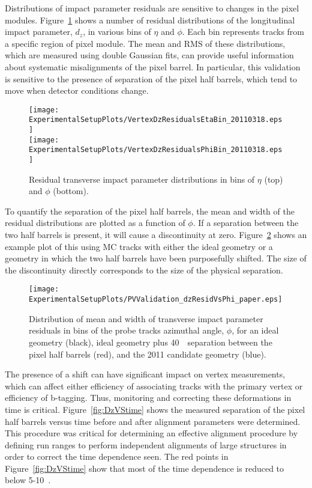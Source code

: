 Distributions of impact parameter residuals are sensitive to changes in the
pixel modules.
Figure~\ref{fig:PVresiduals}
shows a number of residual distributions of the longitudinal
impact parameter, $d_z$, in various bins of $\eta$ and
$\phi$.  Each bin represents tracks from a specific region of pixel 
module.  The mean and RMS of these distributions, which are measured
using double Gaussian fits, can provide useful
information about systematic misalignments of the pixel barrel.  In
particular, this validation is sensitive to the presence of separation of the
pixel half barrels, which tend to move when detector conditions 
change.

\begin{figure}
\begin{center}
\texttt{[image: ExperimentalSetupPlots/VertexDzResidualsEtaBin\_20110318.eps]}\\
\texttt{[image: ExperimentalSetupPlots/VertexDzResidualsPhiBin\_20110318.eps]}
\caption{Residual transverse impact parameter distributions in 
bins of $\eta$ (top) and $\phi$ (bottom).}
\label{fig:PVresiduals}
\end{center}
\end{figure}

To quantify the separation of the pixel half barrels, the mean and
width of the residual distributions are plotted as a function of
$\phi$.  If a separation between the two half barrels is present, it
will cause a discontinuity at zero.  Figure~\ref{fig:dzResidVsPhi}
shows an example plot of this using MC tracks with either the ideal
geometry or a geometry in which the two half barrels have been 
purposefully shifted.  The size of the discontinuity directly 
corresponds to the size of the physical separation.  

\begin{figure}
\begin{center}
\texttt{[image: ExperimentalSetupPlots/PVValidation\_dzResidVsPhi\_paper.eps]}
\caption{Distribution of mean and width of transverse impact parameter residuals 
in bins of the probe tracks azimuthal angle, $\phi$, for an ideal geometry (black), 
ideal geometry plus 40~\microns~separation between the pixel half barrels (red),
and the 2011 candidate geometry (blue).}
\label{fig:dzResidVsPhi}
\end{center}
\end{figure}

The presence of a shift can have significant impact on vertex 
measurements,
which can affect either efficiency of associating tracks with the 
primary
vertex or efficiency of b-tagging. Thus, monitoring and correcting
these deformations in time is critical.  Figure~\ref{fig:DzVStime}
shows the 
measured separation of the pixel half barrels versus time before 
and after alignment parameters were determined.  This procedure
was critical for determining an effective alignment procedure by 
defining
run ranges to perform independent alignments of large structures in order to 
correct the time dependence seen.  The red points in Figure~\ref{fig:DzVStime}
show that most of the time dependence is reduced to below 5-10~\microns.

